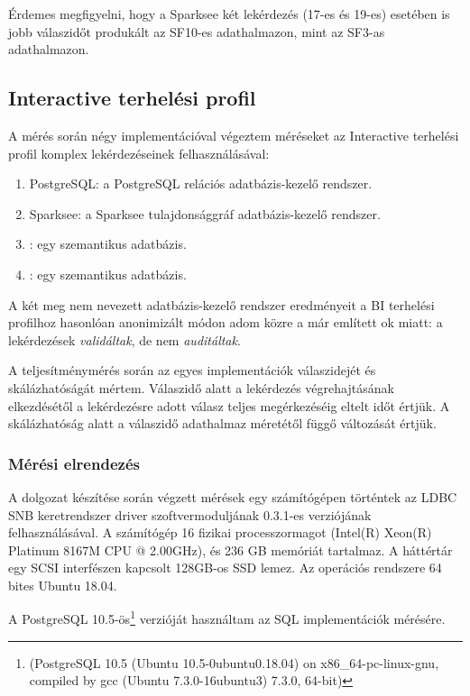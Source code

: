 Érdemes megfigyelni, hogy a Sparksee két lekérdezés (17-es és 19-es) esetében is jobb válaszidőt produkált az SF10-es adathalmazon, mint az SF3-as adathalmazon.

\subsection{Interactive terhelési profil}
A mérés során négy implementációval végeztem méréseket az Interactive terhelési profil komplex lekérdezéseinek felhasználásával:

\begin{enumerate}
	\item PostgreSQL: a PostgreSQL relációs adatbázis-kezelő rendszer.
	\item Sparksee: a Sparksee tulajdonsággráf adatbázis-kezelő rendszer.
	\item \virtuoso: egy szemantikus adatbázis.
	\item \stardog: egy szemantikus adatbázis.
\end{enumerate}

A két meg nem nevezett adatbázis-kezelő rendszer eredményeit a BI terhelési profilhoz hasonlóan anonimizált módon adom közre a már említett ok miatt: a lekérdezések \textit{validáltak}, de nem \textit{auditáltak}.

A teljesítménymérés során az egyes implementációk válaszidejét és skálázhatóságát mértem. Válaszidő alatt a lekérdezés végrehajtásának elkezdésétől a lekérdezésre adott válasz teljes megérkezéséig eltelt időt értjük. A skálázhatóság alatt a válaszidő adathalmaz méretétől függő változását értjük. 

\subsubsection{Mérési elrendezés}

A dolgozat készítése során végzett mérések egy számítógépen történtek az LDBC SNB keretrendszer driver szoftvermoduljának 0.3.1-es verziójának felhasználásával. A számítógép 16 fizikai processzormagot (Intel(R) Xeon(R) Platinum 8167M CPU @ 2.00GHz), és 236 GB memóriát tartalmaz. A háttértár egy SCSI interfészen kapcsolt 128GB-os SSD lemez. Az operációs rendszere 64 bites Ubuntu 18.04.

A PostgreSQL 10.5-ös\footnote{(PostgreSQL 10.5 (Ubuntu 10.5-0ubuntu0.18.04) on x86\_64-pc-linux-gnu, compiled by gcc (Ubuntu 7.3.0-16ubuntu3) 7.3.0, 64-bit)} verzióját használtam az SQL implementációk mérésére.

